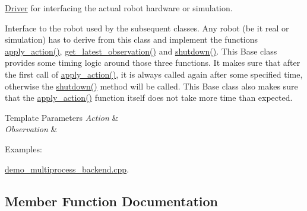 \hyperlink{classDriver}{Driver} for interfacing the actual robot hardware or simulation. 

Interface to the robot used by the subsequent classes. Any robot (be it real or simulation) has to derive from this class and implement the functions \hyperlink{classrobot__interfaces_1_1RobotDriver_a4294e522fcd12b38d69f7d53fae5d74a}{apply\+\_\+action()}, \hyperlink{classrobot__interfaces_1_1RobotDriver_ad13d4f4fdfe78bdde4fc964f07fa45e2}{get\+\_\+latest\+\_\+observation()} and \hyperlink{classrobot__interfaces_1_1RobotDriver_a3451fb8b15d2840b559f3ee858de01f8}{shutdown()}. This Base class provides some timing logic around those three functions. It makes sure that after the first call of \hyperlink{classrobot__interfaces_1_1RobotDriver_a4294e522fcd12b38d69f7d53fae5d74a}{apply\+\_\+action()}, it is always called again after some specified time, otherwise the \hyperlink{classrobot__interfaces_1_1RobotDriver_a3451fb8b15d2840b559f3ee858de01f8}{shutdown()} method will be called. This Base class also makes sure that the \hyperlink{classrobot__interfaces_1_1RobotDriver_a4294e522fcd12b38d69f7d53fae5d74a}{apply\+\_\+action()} function itself does not take more time than expected.


\begin{DoxyTemplParams}{Template Parameters}
{\em Action} & \\
\hline
{\em Observation} & \\
\hline
\end{DoxyTemplParams}
\begin{Desc}
\item[Examples\+: ]\par
\hyperlink{demo_multiprocess_backend_8cpp-example}{demo\+\_\+multiprocess\+\_\+backend.\+cpp}.\end{Desc}


\subsection{Member Function Documentation}
\mbox{\label{classrobot__interfaces_1_1RobotDriver_a4294e522fcd12b38d69f7d53fae5d74a}} 
